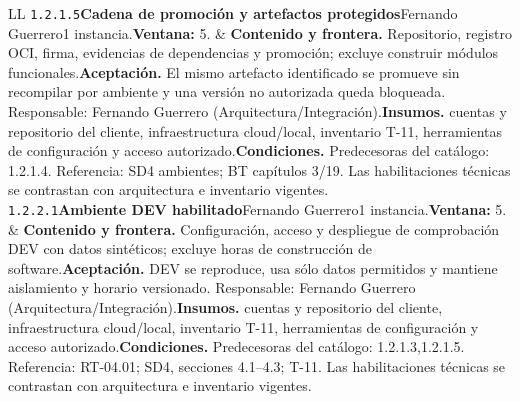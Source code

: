 \begin{longtable}{L{\tabcolsep\relax}L{\tabcolsep\relax}}
\texttt{1.\allowbreak{}2.\allowbreak{}1.\allowbreak{}5}\newline{}\textbf{Cadena de promoción y artefactos protegidos}\newline{}Fernando Guerrero\newline{}1 instancia.\newline{}\textbf{Ventana:} 5. & \textbf{Contenido y frontera.} Repositorio, registro OCI, firma, evidencias de dependencias y promoción; excluye construir módulos funcionales.\newline{}\textbf{Aceptación.} El mismo artefacto identificado se promueve sin recompilar por ambiente y una versión no autorizada queda bloqueada. Responsable: Fernando Guerrero (Arquitectura/Integración).\newline{}\textbf{Insumos.} cuentas y repositorio del cliente, infraestructura cloud/local, inventario T-11, herramientas de configuración y acceso autorizado.\newline{}\textbf{Condiciones.} Predecesoras del catálogo: 1.2.1.4. Referencia: SD4 ambientes; BT capítulos 3/19. Las habilitaciones técnicas se contrastan con arquitectura e inventario vigentes.\\\hline
\texttt{1.\allowbreak{}2.\allowbreak{}2.\allowbreak{}1}\newline{}\textbf{Ambiente DEV habilitado}\newline{}Fernando Guerrero\newline{}1 instancia.\newline{}\textbf{Ventana:} 5. & \textbf{Contenido y frontera.} Configuración, acceso y despliegue de comprobación DEV con datos sintéticos; excluye horas de construcción de software.\newline{}\textbf{Aceptación.} DEV se reproduce, usa sólo datos permitidos y mantiene aislamiento y horario versionado. Responsable: Fernando Guerrero (Arquitectura/Integración).\newline{}\textbf{Insumos.} cuentas y repositorio del cliente, infraestructura cloud/local, inventario T-11, herramientas de configuración y acceso autorizado.\newline{}\textbf{Condiciones.} Predecesoras del catálogo: 1.2.1.3,1.2.1.5. Referencia: RT-04.01; SD4, secciones 4.1--4.3; T-11. Las habilitaciones técnicas se contrastan con arquitectura e inventario vigentes.\\\hline

\end{longtable}
